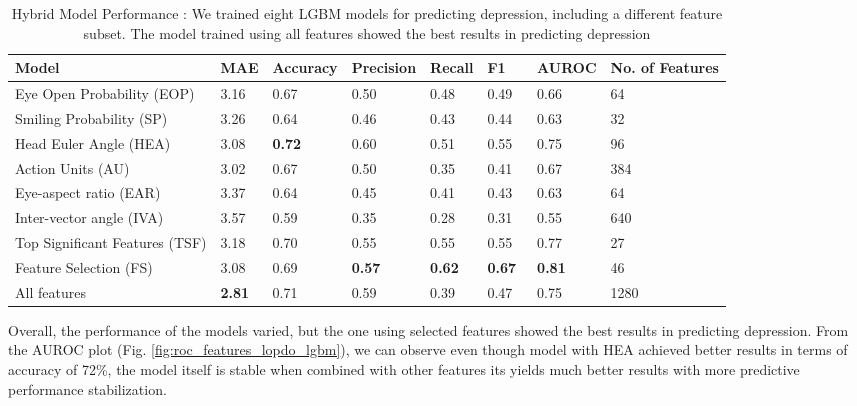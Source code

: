 \begin{table}[h]
\caption{\label{tab:results_features_lopdo} Hybrid Model Performance : We trained eight LGBM models for predicting depression, including a different feature subset. The model trained using all features showed the best results in predicting depression} 

\footnotesize
\centering  
    \begin{tabular}{p{3.4cm}p{1cm}p{1cm}p{1cm}p{1cm}p{1cm}p{1cm}p{1.7cm}}
    \toprule
    \textbf{Model} & \textbf{MAE} & \textbf{Accuracy} & \textbf{Precision} & \textbf{Recall} & \textbf{F1} & \textbf{AUROC} & \textbf{No. of Features} \\ 
    \midrule
    
    Eye Open Probability (EOP) & 3.16 & 0.67\ & 0.50\ & 0.48\ & 0.49\ & 0.66\  &  64 \\

    Smiling Probability (SP) & 3.26 & 0.64\ & 0.46\ & 0.43\ & 0.44\ & 0.63\ &  32 \\
    
    Head Euler Angle (HEA) & 3.08 & \textbf{0.72}\ & 0.60\ & 0.51\ & 0.55\ & 0.75\ &  96 \\

    Action Units (AU) & 3.02 & 0.67\ & 0.50\ & 0.35\ & 0.41\ & 0.67\ &  384 \\
    
    Eye-aspect ratio (EAR) & 3.37 & 0.64\ & 0.45\ & 0.41\ & 0.43\ & 0.63\ &  64 \\

    Inter-vector angle (IVA) & 3.57 & 0.59\ & 0.35\ & 0.28\ & 0.31\ & 0.55\ &  640 \\

    Top Significant Features (TSF) & 3.18 & 0.70\ & 0.55\ & 0.55\ & 0.55\ & 0.77\ & 27 \\

    Feature Selection (FS) & 3.08 & 0.69\ & \textbf{0.57}\ & \textbf{0.62}\ & \textbf{0.67}\ & \textbf{0.81}\ &  46 \\

    All features & \textbf{2.81} & 0.71\ & 0.59\ & 0.39\ & 0.47\ & 0.75\ &  1280 \\
    
    \bottomrule
 
\end{tabular}
\end{table}


Overall, the performance of the models varied, but the one using selected features showed the best results in predicting depression. From the AUROC plot (Fig. \ref{fig:roc_features_lopdo_lgbm}), we can observe even though model with HEA achieved better results in terms of accuracy of 72\%, the model itself is stable when combined with other features its yields much better results with more predictive performance stabilization.


